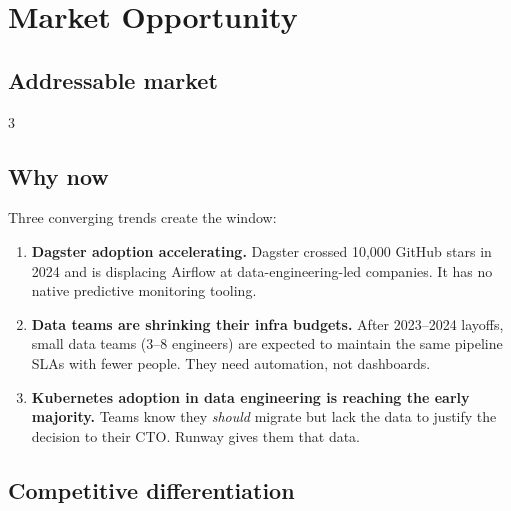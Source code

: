 
\section{Market Opportunity}

\subsection{Addressable market}

\begin{multicols}{3}
\columnbreak
{}
\columnbreak
{}
\end{multicols}

\vspace{6pt}

\subsection{Why now}

Three converging trends create the window:

\begin{enumerate}
  \item \textbf{Dagster adoption accelerating.} Dagster crossed 10,000 GitHub stars in 2024
        and is displacing Airflow at data-engineering-led companies. It has no native predictive
        monitoring tooling.

  \item \textbf{Data teams are shrinking their infra budgets.} After 2023--2024 layoffs, small
        data teams (3--8 engineers) are expected to maintain the same pipeline SLAs with fewer
        people. They need automation, not dashboards.

  \item \textbf{Kubernetes adoption in data engineering is reaching the early majority.}
        Teams know they \emph{should} migrate but lack the data to justify the decision to
        their CTO. Runway gives them that data.
\end{enumerate}

\subsection{Competitive differentiation}

